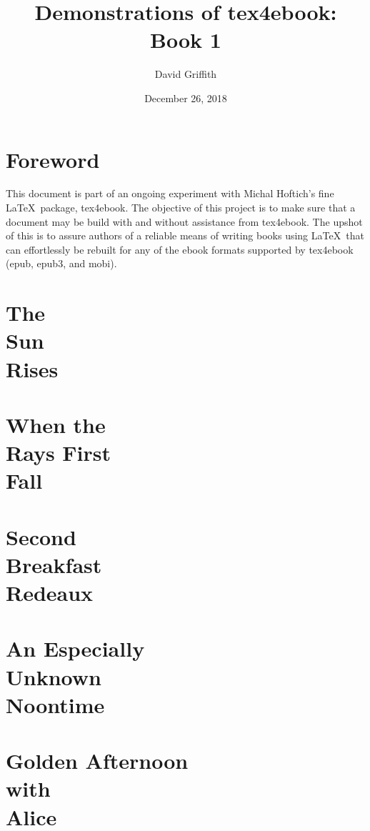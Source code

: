 \documentclass[12pt]{memoir}
\title{\Huge\textbf{Demonstrations of tex4ebook: Book 1}}
\author{David Griffith}
\date{December 26, 2018}
\begin{document}
\frontmatter
\maketitle
\cleartorecto
\tableofcontents*

\mainmatter
\parskip=12pt

\chapter*{\bordeauxfont Foreword}
This document is part of an ongoing experiment with Michal Hoftich's 
fine \LaTeX\ package, tex4ebook.  The objective of this project is to 
make sure that a document may be build with and without assistance from 
tex4ebook.  The upshot of this is to assure authors of a reliable means 
of writing books using \LaTeX\ that can effortlessly be rebuilt for any 
of the ebook formats supported by tex4ebook (epub, epub3, and mobi).

\chapter[The Sun Rises]
{The\\
Sun\\
Rises}
\lipsum[1-20]

\chapter[When the Rays First Fall]
{When the\\
Rays First\\
Fall}
\lipsum[21-40]

\chapter[Second Breakfast Redeaux]
{Second\\
Breakfast\\
Redeaux}
\lipsum[41-60]

\chapter[An Especially Unknown Noontime]
{An Especially\\
Unknown\\
Noontime}
\lipsum[61-80]

\chapter[Golden Afternoon with Alice]
{Golden Afternoon\\
with\\
Alice}
\lipsum[81-100]
\end{document}
